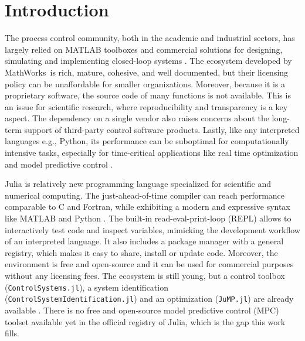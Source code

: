 \section{Introduction}

The process control community, both in the academic and industrial sectors, has largely relied on MATLAB toolboxes and commercial solutions for designing, simulating and implementing closed-loop systems \citep{optimMatlab}. The ecosystem developed by MathWorks\texttrademark\ is rich, mature, cohesive, and well documented, but their licensing policy can be unaffordable for smaller organizations. Moreover, because it is a proprietary software, the source code of many functions is not available. This is an issue for scientific research, where reproducibility and transparency is a key aspect. The dependency on a single vendor also raises concerns about the long-term support of third-party control software products. Lastly, like any interpreted languages e.g., Python, its performance can be suboptimal for computationally intensive tasks, especially for time-critical applications like real time optimization and model predictive control \citep{matlabPythonJulia, juliaML}. 

Julia is relatively new programming language specialized for scientific and numerical computing. The just-ahead-of-time compiler can reach performance comparable to C and Fortran, while exhibiting a modern and expressive syntax like MATLAB and Python \citep{juliaPaper}. The built-in read-eval-print-loop (REPL) allows to interactively test code and inspect variables, mimicking the development workflow of an interpreted language. It also includes a package manager with a general registry, which makes it easy to share, install or update code. Moreover, the environment is free and open-source and it can be used for commercial purposes without any licensing fees. The ecosystem is still young, but a control toolbox (\texttt{ControlSystems.jl}), a system identification (\texttt{ControlSystemIdentification.jl}) and an optimization (\texttt{JuMP.jl}) are already available \citep{controlsystems, jump}. There is no free and open-source model predictive control (MPC) toolset available yet in the official registry of Julia, which is the gap this work fills.

